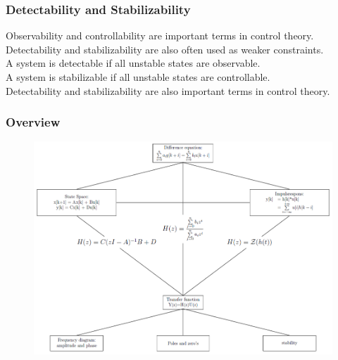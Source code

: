 \begin{frame}
	\frametitle{Detectability and Stabilizability}
	Observability and controllability are important terms in control theory.\\
	Detectability and stabilizability are also often used as weaker constraints.\\
	A system is detectable if all unstable states are observable.\\
	A system is stabilizable if all unstable states are controllable.\\
	Detectability and stabilizability are also important terms in control theory.\\
\end{frame}
\begin{frame}
	\frametitle{Overview}
	\begin{figure}
		\centering
		\includegraphics[width=0.7\linewidth]{Images/discrete_time_systems_28}
		\label{fig:discrete_time_systems_28}
	\end{figure}
\end{frame}
